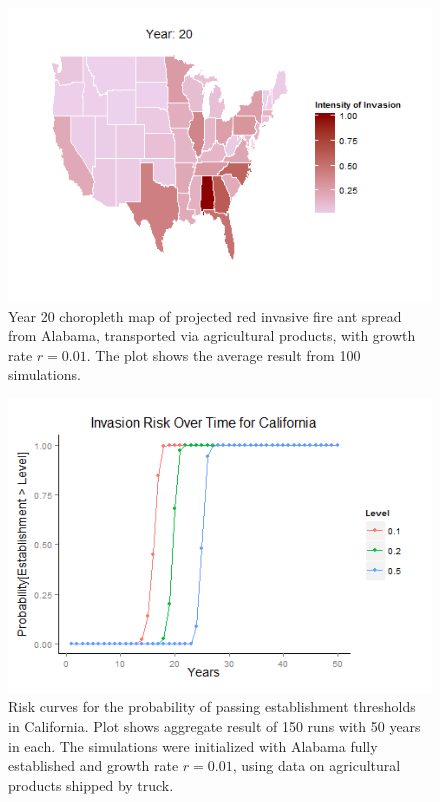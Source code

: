\documentclass[12pt]{article}
\begin{document}
		
				

\begin{figure}[h]
	\centering
		\includegraphics{agprod.png}
	\caption{Year 20 choropleth map of projected red invasive fire ant spread from Alabama, transported via agricultural products, with growth rate $r=0.01$.  The plot shows the average result from 100 simulations.}
	\label{fig:spread map}
\end{figure}

\begin{figure}[h]
	\begin{center}
		\includegraphics{riskcurve.png}
	\end{center}
	\caption{Risk curves for the probability of passing establishment thresholds in California. Plot shows aggregate result of 150 runs with 50 years in each. The simulations were initialized with Alabama fully established and growth rate $r = 0.01$, using data on agricultural products shipped by truck. }
	\label{fig:risk curve}
\end{figure}
\end{document}
